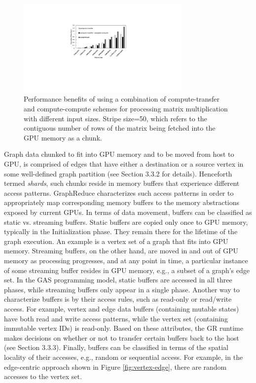 \begin{figure}[!t]
\centering
\includegraphics[width=0.75\textwidth,height=\textheight,keepaspectratio]{figures/2schemes.pdf}
\caption{Performance benefits of using a combination of compute-transfer and compute-compute schemes for processing matrix multiplication with different input sizes. Stripe size=50, which refers to the contiguous number of rows of the matrix being fetched into the GPU memory as a chunk.  }
\label{fig:2schemes}
\end{figure}

Graph data chunked to fit into GPU memory and to be moved from host to GPU, is comprised of edges that have either a destination or 
a source vertex in some well-defined graph partition (see Section 3.3.2 for details). Henceforth termed {\em shards}, such chunks reside
in memory buffers that experience different access patterns. GraphReduce characterizes such access patterns in order to appropriately map
corresponding memory buffers to the memory abstractions exposed by current GPUs. In terms of data movement, buffers can be classified as static 
vs. streaming buffers. Static buffers are copied only once to GPU memory, typically in the Initialization phase. They remain there for 
the lifetime of the graph execution. An example is a vertex set of a graph that fits into GPU memory. Streaming buffers, on the other
hand, are moved in and out of GPU memory as processing progresses, and at any point in time, a particular instance of some streaming buffer 
resides in GPU memory, e.g., a subset of a graph's edge set. In the GAS programming model, static buffers are accessed in all three phases, 
while streaming buffers only appear in a single phase. Another way to characterize buffers is by their access rules, such as read-only 
or read/write access. For example, vertex and edge data buffers (containing mutable states) have both read and write access patterns, 
while the vertex set (containing immutable vertex IDs) is read-only. Based on these attributes, the GR runtime makes decisions on whether 
or not to transfer certain buffers back to the host (see Section 3.3.3). Finally, buffers can be classified in terms of the spatial locality 
of their accesses, e.g., random or sequential access. For example, in the edge-centric approach shown in Figure \ref{fig:vertex-edge}, 
there are random accesses to the vertex set.

